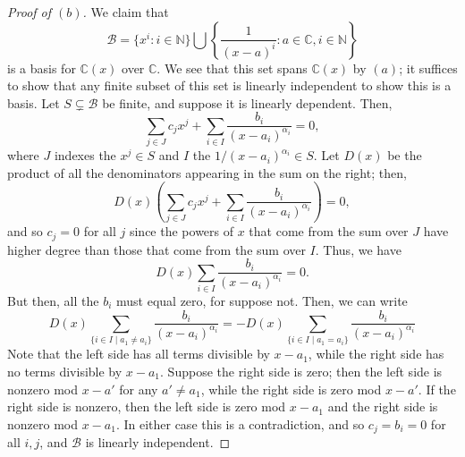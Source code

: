 \documentclass[12pt]{article}
\theoremstyle{remark}
\begin{document}
\begin{proof}[Proof of $(b)$]
  We claim that
  \begin{equation*}
    \mathcal{B} = \{x^i : i \in \mathbb{N}\}\bigcup \left\{ \frac{1}{(x-a)^i} : a \in \mathbb{C}, i \in \mathbb{N} \right\}
  \end{equation*}
  is a basis for $\mathbb{C}(x)$ over $\mathbb{C}$. We see that this set spans $\mathbb{C}(x)$ by $(a)$; it suffices to show that any finite subset of this set is linearly independent to show this is a basis. Let $S \subsetneq \mathcal{B}$ be finite, and suppose it is linearly dependent. Then,
  \begin{equation*}
    \sum_{j \in J} c_jx^j + \sum_{i \in I} \frac{b_i}{(x-a_i)^{\alpha_i}} = 0,
  \end{equation*}
  where $J$ indexes the $x^j \in S$ and $I$ the $1/(x-a_i)^{\alpha_i} \in S$. Let $D(x)$ be the product of all the denominators appearing in the sum on the right; then,
  \begin{equation*}
    D(x) \left( \sum_{j \in J}c_jx^j + \sum_{i \in I} \frac{b_i}{(x-a_i)^{\alpha_i}} \right) = 0,
  \end{equation*}
  and so $c_j = 0$ for all $j$ since the powers of $x$ that come from the sum over $J$ have higher degree than those that come from the sum over $I$. Thus, we have
  \begin{equation*}
    D(x)\sum_{i \in I} \frac{b_i}{(x-a_i)^{\alpha_i}} = 0.
  \end{equation*}
  But then, all the $b_i$ must equal zero, for suppose not. Then, we can write
  \begin{equation*}
    D(x)\sum_{\{i \in I \mid a_1 \ne a_i\}} \frac{b_i}{(x-a_i)^{\alpha_i}} = - D(x)\sum_{\{i \in I \mid a_1 = a_i\}} \frac{b_i}{(x-a_i)^{\alpha_i}}
  \end{equation*}
  Note that the left side has all terms divisible by $x-a_1$, while the right side has no terms divisible by $x-a_1$. Suppose the right side is zero; then the left side is nonzero mod $x-a'$ for any $a' \ne a_1$, while the right side is zero mod $x-a'$. If the right side is nonzero, then the left side is zero mod $x-a_1$ and the right side is nonzero mod $x-a_1$. In either case this is a contradiction, and so $c_j = b_i = 0$ for all $i,j$, and $\mathcal{B}$ is linearly independent.
\end{proof}
\end{document}
